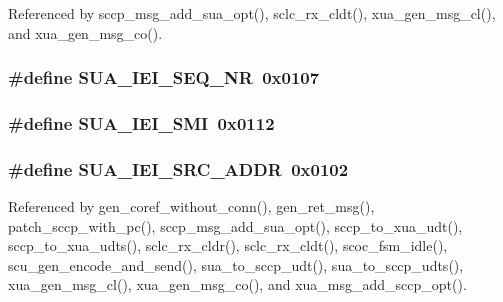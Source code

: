 Referenced by sccp\+\_\+msg\+\_\+add\+\_\+sua\+\_\+opt(), sclc\+\_\+rx\+\_\+cldt(), xua\+\_\+gen\+\_\+msg\+\_\+cl(), and xua\+\_\+gen\+\_\+msg\+\_\+co().

\subsubsection[{S\+U\+A\+\_\+\+I\+E\+I\+\_\+\+S\+E\+Q\+\_\+\+NR}]{\setlength{\rightskip}{0pt plus 5cm}\#define S\+U\+A\+\_\+\+I\+E\+I\+\_\+\+S\+E\+Q\+\_\+\+NR~0x0107}\label{sua_8h_a0a076c9d89f0ecab93f4b122fd4f6f73}
\subsubsection[{S\+U\+A\+\_\+\+I\+E\+I\+\_\+\+S\+MI}]{\setlength{\rightskip}{0pt plus 5cm}\#define S\+U\+A\+\_\+\+I\+E\+I\+\_\+\+S\+MI~0x0112}\label{sua_8h_a364b932f3d497d6032ce0c9265a6cb48}
\subsubsection[{S\+U\+A\+\_\+\+I\+E\+I\+\_\+\+S\+R\+C\+\_\+\+A\+D\+DR}]{\setlength{\rightskip}{0pt plus 5cm}\#define S\+U\+A\+\_\+\+I\+E\+I\+\_\+\+S\+R\+C\+\_\+\+A\+D\+DR~0x0102}\label{sua_8h_a2eda67f4e3c09c507cdf9e624f97c364}


Referenced by gen\+\_\+coref\+\_\+without\+\_\+conn(), gen\+\_\+ret\+\_\+msg(), patch\+\_\+sccp\+\_\+with\+\_\+pc(), sccp\+\_\+msg\+\_\+add\+\_\+sua\+\_\+opt(), sccp\+\_\+to\+\_\+xua\+\_\+udt(), sccp\+\_\+to\+\_\+xua\+\_\+udts(), sclc\+\_\+rx\+\_\+cldr(), sclc\+\_\+rx\+\_\+cldt(), scoc\+\_\+fsm\+\_\+idle(), scu\+\_\+gen\+\_\+encode\+\_\+and\+\_\+send(), sua\+\_\+to\+\_\+sccp\+\_\+udt(), sua\+\_\+to\+\_\+sccp\+\_\+udts(), xua\+\_\+gen\+\_\+msg\+\_\+cl(), xua\+\_\+gen\+\_\+msg\+\_\+co(), and xua\+\_\+msg\+\_\+add\+\_\+sccp\+\_\+opt().

